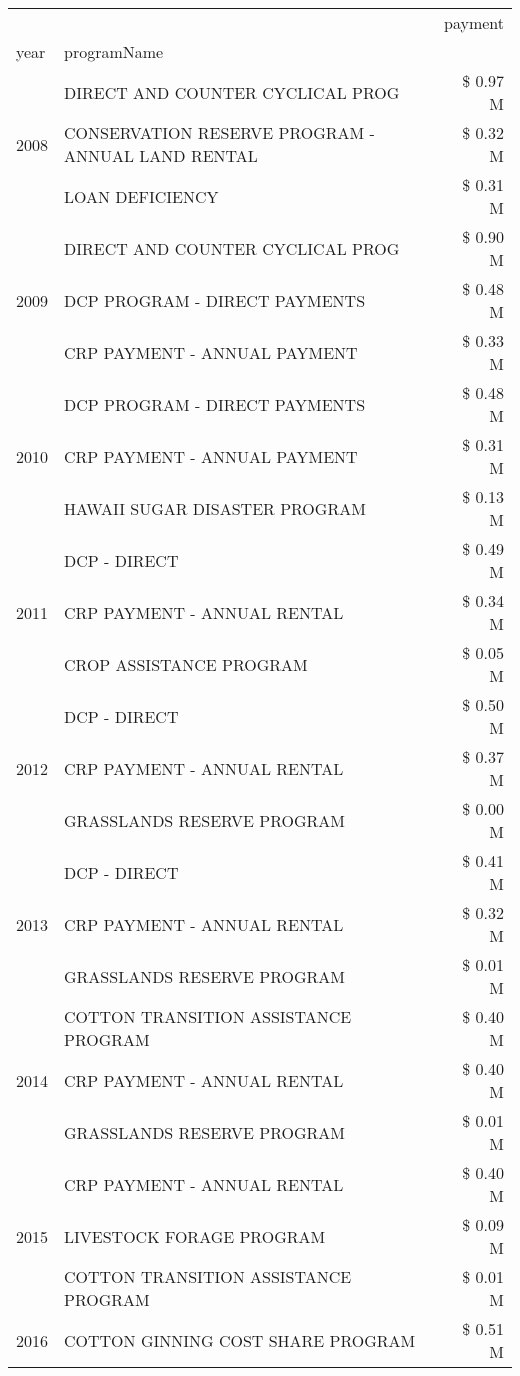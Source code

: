 \begin{tabular}{llr}
\toprule
 &  & payment \\
year & programName &  \\
\midrule
\multirow[t]{3}{*}{2008} & DIRECT AND COUNTER CYCLICAL PROG & \$ 0.97 M \\
 & CONSERVATION RESERVE PROGRAM - ANNUAL LAND RENTAL & \$ 0.32 M \\
 & LOAN DEFICIENCY & \$ 0.31 M \\
\cline{1-3}
\multirow[t]{3}{*}{2009} & DIRECT AND COUNTER CYCLICAL PROG & \$ 0.90 M \\
 & DCP PROGRAM - DIRECT PAYMENTS & \$ 0.48 M \\
 & CRP PAYMENT - ANNUAL PAYMENT & \$ 0.33 M \\
\cline{1-3}
\multirow[t]{3}{*}{2010} & DCP PROGRAM - DIRECT PAYMENTS & \$ 0.48 M \\
 & CRP PAYMENT - ANNUAL PAYMENT & \$ 0.31 M \\
 & HAWAII SUGAR DISASTER PROGRAM & \$ 0.13 M \\
\cline{1-3}
\multirow[t]{3}{*}{2011} & DCP - DIRECT & \$ 0.49 M \\
 & CRP PAYMENT - ANNUAL RENTAL & \$ 0.34 M \\
 & CROP ASSISTANCE PROGRAM & \$ 0.05 M \\
\cline{1-3}
\multirow[t]{3}{*}{2012} & DCP - DIRECT & \$ 0.50 M \\
 & CRP PAYMENT - ANNUAL RENTAL & \$ 0.37 M \\
 & GRASSLANDS RESERVE PROGRAM & \$ 0.00 M \\
\cline{1-3}
\multirow[t]{3}{*}{2013} & DCP - DIRECT & \$ 0.41 M \\
 & CRP PAYMENT - ANNUAL RENTAL & \$ 0.32 M \\
 & GRASSLANDS RESERVE PROGRAM & \$ 0.01 M \\
\cline{1-3}
\multirow[t]{3}{*}{2014} & COTTON TRANSITION ASSISTANCE PROGRAM & \$ 0.40 M \\
 & CRP PAYMENT - ANNUAL RENTAL & \$ 0.40 M \\
 & GRASSLANDS RESERVE PROGRAM & \$ 0.01 M \\
\cline{1-3}
\multirow[t]{3}{*}{2015} & CRP PAYMENT - ANNUAL RENTAL & \$ 0.40 M \\
 & LIVESTOCK FORAGE PROGRAM & \$ 0.09 M \\
 & COTTON TRANSITION ASSISTANCE PROGRAM & \$ 0.01 M \\
\cline{1-3}
\multirow[t]{3}{*}{2016} & COTTON GINNING COST SHARE PROGRAM & \$ 0.51 M \\

\end{tabular}

